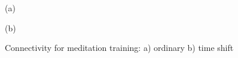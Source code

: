 \begin{figure}[h!]
\begin{minipage}[h]{0.49\linewidth}
 (a) \\
\end{minipage}
\hfill
\begin{minipage}[h]{0.5\linewidth}
 (b) \\
\end{minipage}
\caption{Connectivity for meditation training: a) ordinary b) time shift} 
\end{figure}

